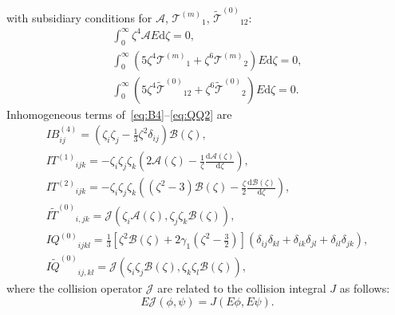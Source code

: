\documentclass[]{elsarticle} %
\newcommand{\dd}{\mathrm{d}}
\newcommand{\der}[2][]{\frac{\dd#1}{\dd#2}}
\newcommand{\T}[1]{\ensuremath{\mathcal{T}^{(#1)}}}
\newcommand{\TT}{\ensuremath{\tilde{\mathcal{T}}^{(0)}}}
\newcommand{\IF}[2][0]{\ensuremath{I{#2}^{(#1)}}}
\newcommand{\IFF}[1]{\ensuremath{I\tilde{#1}^{(0)}}}
\newcommand{\ZZZ}{\zeta_i\zeta_j\zeta_k}
\newcommand{\DD}[2]{\delta_{#1}\delta_{#2}}
\begin{document}
with subsidiary conditions for \(\mathcal{A}\), \(\T{m}_1\), \(\TT_{12}\):
\begin{gather}
    \int_0^\infty \zeta^4 \mathcal{A} E \dd\zeta = 0, \label{eq:A_constraint}\\
    \int_0^\infty \left( 5\zeta^4\T{m}_1 + \zeta^6\T{m}_2 \right) E \dd\zeta = 0, \label{eq:Tm_constraint}\\
    \int_0^\infty \left( 5\zeta^4\TT_{12} + \zeta^6\TT_2 \right) E \dd\zeta = 0. \label{eq:T12_constraint}
\end{gather}
Inhomogeneous terms of~\eqref{eq:B4}--\eqref{eq:QQ2} are
\begin{gather}
    IB^{(4)}_{ij} = \left(\zeta_i\zeta_j-\frac13\zeta^2\delta_{ij}\right)\mathcal{B}(\zeta), \\
    \IF[1]{T}_{ijk} = -\ZZZ\left( 2\mathcal{A}(\zeta) - \frac1\zeta \der[\mathcal{A}(\zeta)]{\zeta} \right), \\
    \IF[2]{T}_{ijk} = -\ZZZ\left( (\zeta^2-3)\mathcal{B}(\zeta) - \frac\zeta2 \der[\mathcal{B}(\zeta)]{\zeta} \right), \\
    \IFF{T}_{i,jk} = \mathcal{J}(\zeta_i\mathcal{A}(\zeta), \zeta_j\zeta_k\mathcal{B}(\zeta)), \\
    \IF{Q}_{ijkl} = \frac13\left[\zeta^2\mathcal{B}(\zeta)+2\gamma_1\left(\zeta^2-\frac32\right)\right]
        (\DD{ij}{kl}+\DD{ik}{jl}+\DD{il}{jk}), \\
    \IFF{Q}_{ij,kl} = \mathcal{J}(\zeta_i\zeta_j\mathcal{B}(\zeta), \zeta_k\zeta_l\mathcal{B}(\zeta)),
\end{gather}
where the collision operator \(\mathcal{J}\) are related to the collision integral \(J\) as follows:
\begin{equation}\label{eq:mathcalJ}
    E\mathcal{J}(\phi, \psi) = J(E\phi, E\psi).
\end{equation}
\end{document}
